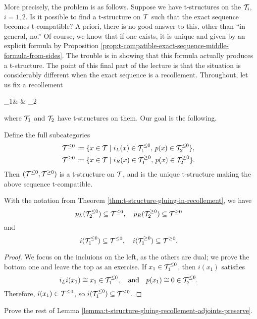 More precisely, the problem is as follows. Suppose we have t-structures on the \(\mathcal{T}_i\), \(i=1,2\). Is it possible to find a t-structure on \(\mathcal{T}\) such that the exact sequence
becomes t-compatible? A priori, there is no good answer to this, other than ``in general, no.'' Of course, we know that if one exists, it is unique and given by an explicit formula by
Proposition \ref{prop:t-compatible-exact-sequence-middle-formula-from-sides}. The trouble is in showing that this formula actually produces a t-structure.
The point of this final part of the lecture is that the situation is considerably different when the exact sequence is a recollement.
Throughout, let us fix a recollement
\begin{diagram*}[column sep=large]
	\calT_1\ar[r,"i" description,""{below,name=A},""{above,name=AA}] &
		\calT \ar[r,"p" description,""{below,name=C},""{above,name=CC}]\ar[l,bend left,shift left,"i_R",""{above,name=B}]\ar[l,bend right,shift right,"i_L"',""{below,name=BB}] &
		\calT_2 \ar[l,bend left,shift left,"p_R",""{above,name=D}]\ar[l,bend right,shift right,"p_L"',""{below,name=DD}]
		\ar[from=B,to=A,symbol=\vdash]\ar[from=D,to=C,symbol=\vdash]
		\ar[from=AA,to=BB,symbol=\vdash]\ar[from=CC,to=DD,symbol=\vdash]
\end{diagram*}
where \(\mathcal{T}_1\) and \(\mathcal{T}_2\) have t-structures on them. Our goal is the following.
\begin{theorem}\label{thm:t-structure-gluing-in-recollement}
	Define the full subcategories
	\begin{align*}
		\mathcal{T}^{\leq 0} &:= \{ x \in \mathcal{T} \mid i_L(x) \in \mathcal{T}_1^{\leq 0},\, p(x)\in\mathcal{T}_2^{\leq 0} \}, \\
		\mathcal{T}^{\geq 0} &:= \{ x \in \mathcal{T} \mid i_R(x) \in \mathcal{T}_1^{\geq 0},\, p(x)\in\mathcal{T}_2^{\geq 0} \}.
	\end{align*}
	Then \((\mathcal{T}^{\leq 0},\mathcal{T}^{\geq 0})\) is a t-structure on \(\mathcal{T}\), and is the unique t-structure making the above sequence t-compatible.
\end{theorem}


\begin{lemma}\label{lemma:t-structure-gluing-recollement-adjoints-preserve}
	With the notation from Theorem \ref{thm:t-structure-gluing-in-recollement}, we have
	\[ p_L(\mathcal{T}_2^{\leq 0}) \subseteq \mathcal{T}^{\leq 0},\quad p_R(\mathcal{T}_2^{\geq 0}) \subseteq \mathcal{T}^{\geq 0} \]
	and
	\[ i(\mathcal{T}_1^{\leq 0})\subseteq \mathcal{T}^{\leq 0},\quad i(\mathcal{T}_1^{\geq 0})\subseteq\mathcal{T}^{\geq 0}. \]
\end{lemma}
\begin{proof}
We focus on the incluions on the left, as the others are dual; we prove the bottom one and leave the top as an exercise. If \(x_1\in\mathcal{T}_1^{\leq 0}\),
then \(i(x_1)\) satisfies
\[ i_Li(x_1) \cong x_1 \in \mathcal{T}_1^{\leq 0},\quad \text{and} \quad p(x_1) \cong 0 \in\mathcal{T}_2^{\leq 0}. \]
Therefore, \(i(x_1)\in\mathcal{T}^{\leq 0}\), so \(i(\mathcal{T}_1^{\leq 0})\subseteq\mathcal{T}^{\leq 0}\).
\end{proof}
\begin{exercise}
	Prove the rest of Lemma \ref{lemma:t-structure-gluing-recollement-adjoints-preserve}.
\end{exercise}


